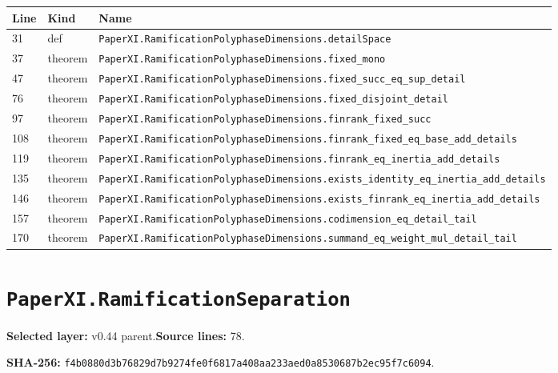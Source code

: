 \documentclass[10pt,oneside]{book}
\begin{document}
\begin{longtable}{@{}p{}p{}p{}@{}}\toprule Line&Kind&Name\\\midrule\endhead

31&def&\nolinkurl{PaperXI.RamificationPolyphaseDimensions.detailSpace}\\

37&theorem&\nolinkurl{PaperXI.RamificationPolyphaseDimensions.fixed_mono}\\

47&theorem&\nolinkurl{PaperXI.RamificationPolyphaseDimensions.fixed_succ_eq_sup_detail}\\

76&theorem&\nolinkurl{PaperXI.RamificationPolyphaseDimensions.fixed_disjoint_detail}\\

97&theorem&\nolinkurl{PaperXI.RamificationPolyphaseDimensions.finrank_fixed_succ}\\

108&theorem&\nolinkurl{PaperXI.RamificationPolyphaseDimensions.finrank_fixed_eq_base_add_details}\\

119&theorem&\nolinkurl{PaperXI.RamificationPolyphaseDimensions.finrank_eq_inertia_add_details}\\

135&theorem&\nolinkurl{PaperXI.RamificationPolyphaseDimensions.exists_identity_eq_inertia_add_details}\\

146&theorem&\nolinkurl{PaperXI.RamificationPolyphaseDimensions.exists_finrank_eq_inertia_add_details}\\

157&theorem&\nolinkurl{PaperXI.RamificationPolyphaseDimensions.codimension_eq_detail_tail}\\

170&theorem&\nolinkurl{PaperXI.RamificationPolyphaseDimensions.summand_eq_weight_mul_detail_tail}\\

\bottomrule\end{longtable}

\section{\texorpdfstring{\nolinkurl{PaperXI.RamificationSeparation}}{PaperXI.RamificationSeparation}}\label{module:PaperXI.RamificationSeparation}

\textbf{Selected layer:} v0.44 parent.\quad\textbf{Source lines:} 78.\par\textbf{SHA-256:} {\scriptsize\nolinkurl{f4b0880d3b76829d7b9274fe0f6817a408aa233aed0a8530687b2ec95f7c6094}}.
\end{document}
